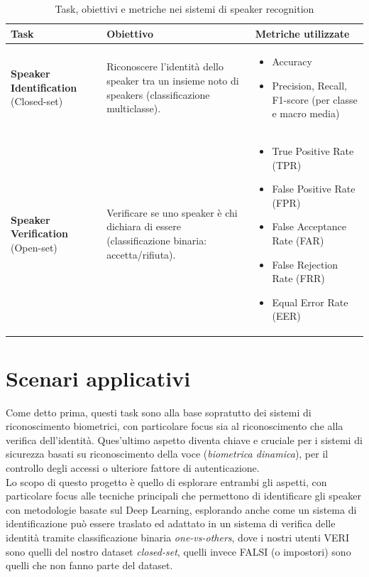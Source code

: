 \begin{table}[ht]
    \centering
    \renewcommand{\arraystretch}{1.4}
    \begin{tabular}{@{} m{4cm} m{5.5cm} m{6.5cm} @{}}
    \toprule
    \textbf{Task} & \textbf{Obiettivo} & \textbf{Metriche utilizzate} \\
    \midrule
    \textbf{Speaker Identification} (Closed-set) & 
    Riconoscere l'identità dello speaker tra un insieme noto di speakers (classificazione multiclasse). & 
    \begin{itemize}
    \item Accuracy
    \item Precision, Recall, F1-score (per classe e macro media)
    \end{itemize} \\
    \midrule
    \textbf{Speaker Verification} (Open-set) & 
    Verificare se uno speaker è chi dichiara di essere (classificazione binaria: accetta/rifiuta). & 
    \begin{itemize}
    \item True Positive Rate (TPR)
    \item False Positive Rate (FPR)
    \item False Acceptance Rate (FAR)
    \item False Rejection Rate (FRR)
    \item Equal Error Rate (EER)
    \end{itemize} \\

    \bottomrule
    \end{tabular}
    \caption{Task, obiettivi e metriche nei sistemi di speaker recognition}
    \label{tab:metriche}
\end{table}

\section{Scenari applicativi}
Come detto prima, questi task sono alla base sopratutto dei sistemi di riconoscimento biometrici, con particolare focus sia al riconoscimento che alla verifica dell'identità. 
Ques'ultimo aspetto diventa chiave e cruciale per i sistemi di sicurezza basati su riconoscimento della voce (\textit{biometrica dinamica}), per il controllo degli accessi o ulteriore fattore di autenticazione. \\
Lo scopo di questo progetto è quello di esplorare entrambi gli aspetti, con particolare focus alle tecniche principali che permettono di identificare gli speaker con metodologie basate sul Deep Learning, 
esplorando anche come un sistema di identificazione può essere traslato ed adattato in un sistema di verifica delle identità tramite classificazione binaria \textit{one-vs-others}, 
dove i nostri utenti VERI sono quelli del nostro dataset \textit{closed-set}, quelli invece FALSI (o impostori) sono quelli che non fanno parte del dataset.
